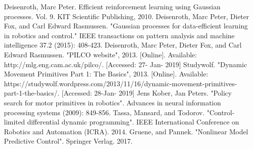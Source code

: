 \documentclass[letterpaper, 10 pt, conference]{ieeeconf}  %
\begin{document}
\begin{thebibliography}{99}

 Deisenroth, Marc Peter. Efficient reinforcement learning using Gaussian processes. Vol. 9. KIT Scientific Publishing, 2010.
 Deisenroth, Marc Peter, Dieter Fox, and Carl Edward Rasmussen. "Gaussian processes for data-efficient learning in robotics and control." IEEE transactions on pattern analysis and machine intelligence 37.2 (2015): 408-423.
 Deisenroth, Marc Peter, Dieter Fox, and Carl Edward Rasmussen. "PILCO website", 2013. [Online]. Available: http://mlg.eng.cam.ac.uk/pilco/. [Accessed: 27- Jan- 2019]
 Studywolf. "Dynamic Movement Primitives Part 1: The Basics", 2013. [Online]. Available: https://studywolf.wordpress.com/2013/11/16/dynamic-movement-primitives-part-1-the-basics/. [Accessed: 28-Jan- 2019]
 Jens Kober, Jan Peters. "Policy search for motor primitives in robotics". Advances in neural information processing systems (2009): 849-856.
 Tassa, Mansard, and Todorov. "Control-limited differential dynamic programming". IEEE International Conference on Robotics and Automation (ICRA). 2014.
 Gruene, and Pannek. "Nonlinear Model Predictive Control". Springer Verlag. 2017.


\end{thebibliography}
\end{document}
